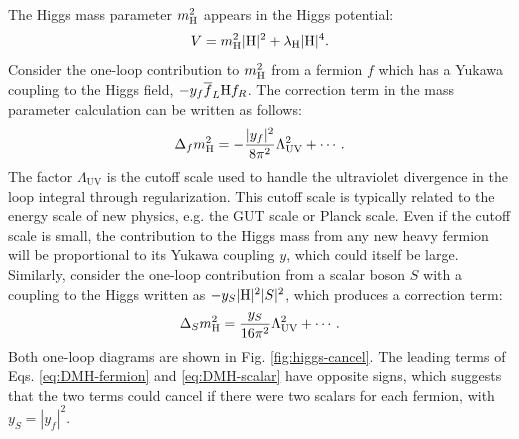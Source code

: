 The Higgs mass parameter $m_{\mathrm{H}}^{2}$ appears in the Higgs potential:
\begin{equation}
V = m_{\mathrm{H}}^{2}|\mathrm{H}|^{2} + \lambda_{\mathrm{H}}|\mathrm{H}|^{4}.
\end{equation}
Consider the one-loop contribution to $m_{\mathrm{H}}^{2}$ from a fermion $f$ which has a Yukawa coupling to the Higgs field, $-y_{f} \overline{f}_{L} \mathrm{H} f_{R}$. The correction term in the mass parameter calculation can be written as follows:
\begin{equation}
\Delta_{f} m_{\mathrm{H}}^{2} = -\frac{|y_{f}|^{2}}{8\pi^{2}}\Lambda_{\text{UV}}^{2} + \cdots. \label{eq:DMH-fermion}
\end{equation}
The factor $\Lambda_{\text{UV}}$ is the cutoff scale used to handle the ultraviolet divergence in the loop integral through regularization. This cutoff scale is typically related to the energy scale of new physics, e.g. the GUT scale or Planck scale. Even if the cutoff scale is small, the contribution to the Higgs mass from any new heavy fermion will be proportional to its Yukawa coupling $y$, which could itself be large. Similarly, consider the one-loop contribution from a scalar boson $S$ with a coupling to the Higgs written as $-y_{S} |\mathrm{H}|^{2} |S|^{2}$, which produces a correction term:
\begin{equation}
\Delta_{S} m_{\mathrm{H}}^{2} = \frac{y_{S}}{16\pi^{2}}\Lambda_{\text{UV}}^{2} + \cdots. \label{eq:DMH-scalar}
\end{equation}
Both one-loop diagrams are shown in Fig. \ref{fig:higgs-cancel}. The leading terms of Eqs. \eqref{eq:DMH-fermion} and \eqref{eq:DMH-scalar} have opposite signs, which suggests that the two terms could cancel if there were two scalars for each fermion, with $y_{S} = |y_{f}|^2$.

